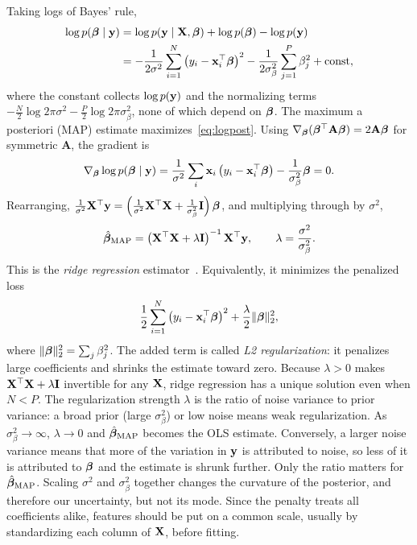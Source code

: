 Taking logs of Bayes' rule,
\begin{align}
  \log p(\boldsymbol{\beta}\mid\mathbf{y}) &= \log p(\mathbf{y}\mid\mathbf{X},\boldsymbol{\beta}) + \log p(\boldsymbol{\beta}) - \log p(\mathbf{y}) \nonumber\\
  &= -\frac{1}{2\sigma^2}\sum_{i=1}^N\left(y_i-\mathbf{x}_i^\top\boldsymbol{\beta}\right)^2 - \frac{1}{2\sigma_\beta^2}\sum_{j=1}^P\beta_j^2 + \text{const},
  \label{eq:logpost}
\end{align}
where the constant collects $\log p(\mathbf{y})$ and the normalizing terms $-\frac{N}{2}\log 2\pi\sigma^2-\frac{P}{2}\log 2\pi\sigma_\beta^2$, none of which depend on $\boldsymbol{\beta}$. The maximum a posteriori (MAP) estimate maximizes~\eqref{eq:logpost}. Using $\nabla_{\boldsymbol{\beta}}(\boldsymbol{\beta}^\top\mathbf{A}\boldsymbol{\beta})=2\mathbf{A}\boldsymbol{\beta}$ for symmetric $\mathbf{A}$, the gradient is
\begin{equation}
  \nabla_{\boldsymbol{\beta}}\log p(\boldsymbol{\beta}\mid\mathbf{y}) = \frac{1}{\sigma^2}\sum_i\mathbf{x}_i\left(y_i-\mathbf{x}_i^\top\boldsymbol{\beta}\right) - \frac{1}{\sigma_\beta^2}\boldsymbol{\beta} = 0 .
\end{equation}
Rearranging, $\frac{1}{\sigma^2}\mathbf{X}^\top\mathbf{y} = \left(\frac{1}{\sigma^2}\mathbf{X}^\top\mathbf{X} + \frac{1}{\sigma_\beta^2}\mathbf{I}\right)\boldsymbol{\beta}$, and multiplying through by $\sigma^2$,
\begin{equation}
  \hat{\boldsymbol{\beta}}_{\text{MAP}} = \left(\mathbf{X}^\top\mathbf{X} + \lambda\mathbf{I}\right)^{-1}\mathbf{X}^\top\mathbf{y}, \qquad \lambda = \frac{\sigma^2}{\sigma^2_\beta}.
  \label{eq:ridge}
\end{equation}
This is the \emph{ridge regression} estimator~\citep{hoerl1970}. Equivalently, it minimizes the penalized loss
\begin{equation}
  \frac{1}{2}\sum_{i=1}^N\left(y_i-\mathbf{x}_i^\top\boldsymbol{\beta}\right)^2 + \frac{\lambda}{2}\|\boldsymbol{\beta}\|_2^2 ,
\end{equation}
where $\|\boldsymbol{\beta}\|_2^2=\sum_j\beta_j^2$. The added term is called \emph{L2 regularization}: it penalizes large coefficients and shrinks the estimate toward zero. Because $\lambda>0$ makes $\mathbf{X}^\top\mathbf{X}+\lambda\mathbf{I}$ invertible for any $\mathbf{X}$, ridge regression has a unique solution even when $N<P$. The regularization strength $\lambda$ is the ratio of noise variance to prior variance: a broad prior (large $\sigma_\beta^2$) or low noise means weak regularization. As $\sigma_\beta^2\to\infty$, $\lambda\to 0$ and $\hat{\boldsymbol{\beta}}_{\text{MAP}}$ becomes the OLS estimate. Conversely, a larger noise variance means that more of the variation in $\mathbf{y}$ is attributed to noise, so less of it is attributed to $\boldsymbol{\beta}$ and the estimate is shrunk further. Only the ratio matters for $\hat{\boldsymbol{\beta}}_{\text{MAP}}$. Scaling $\sigma^2$ and $\sigma_\beta^2$ together changes the curvature of the posterior, and therefore our uncertainty, but not its mode. Since the penalty treats all coefficients alike, features should be put on a common scale, usually by standardizing each column of $\mathbf{X}$, before fitting.

